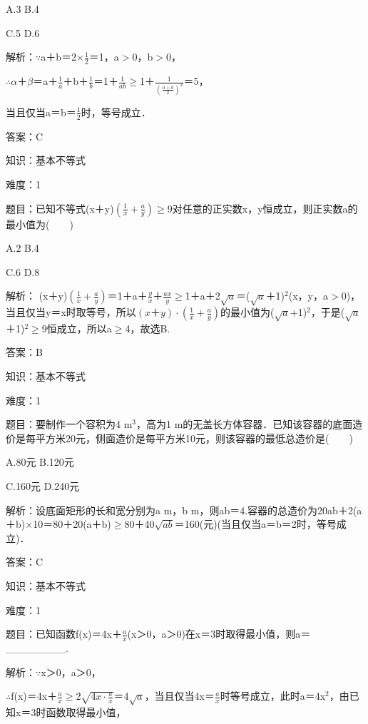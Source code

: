\documentclass{article} %
\begin{document}
A.3    B.4  

C.5    D.6

解析：$\mathrm{\because}$a＋b＝2$\mathrm{\times}$$\frac{1}{2}$＝1，a$\mathrm{>}$0，b$\mathrm{>}$0，

$\mathrm{\therefore}$$\alpha$＋$\beta$＝a＋$\frac{1}{a}$＋b＋$\frac{1}{b}$＝1＋$\frac{1}{ab}$$\mathrm{\ge}$1＋$\frac{1}{(\frac{a+b}{2})^2}$＝5，

当且仅当a＝b＝$\frac{1}{2}$时，等号成立．

答案：C



知识：基本不等式

难度：1

题目：已知不等式(x＋y)$(\frac{1}{x}+\frac{a}{y})$$\mathrm{\ge}$9对任意的正实数x，y恒成立，则正实数a的最小值为(　　)

A.2   B.4  

C.6   D.8

解析： (x＋y)$(\frac{1}{x}+\frac{a}{y})$＝1＋a＋$\frac{y}{x}$＋$\frac{ax}{y}$$\mathrm{\ge}$1＋a＋2$\sqrt{a}$＝($\sqrt{a}$＋1)${}^{2}$(x，y，a$\mathrm{>}$0)，当且仅当y＝x时取等号，所以$(x＋y)\cdot(\frac{1}{x}+\frac{a}{y})$的最小值为($\sqrt{a}$+1)${}^{2}$，于是($\sqrt{a}$＋1)${}^{2}$$\mathrm{\ge}$9恒成立，所以a$\mathrm{\ge}$4，故选B.

答案：B



知识：基本不等式

难度：1

题目：要制作一个容积为4 m${}^{3}$，高为1 m的无盖长方体容器．已知该容器的底面造价是每平方米20元，侧面造价是每平方米10元，则该容器的最低总造价是(　　)

A.80元  B.120元  

C.160元  D.240元

解析：设底面矩形的长和宽分别为a m，b m，则ab＝4.容器的总造价为20ab＋2(a＋b)$\mathrm{\times}$10＝80＋20(a＋b)$\mathrm{\ge}$80＋40$\sqrt{ab}$＝160(元)(当且仅当a＝b＝2时，等号成立)．

答案：C



知识：基本不等式

难度：1

题目：已知函数f(x)＝4x＋$\frac{a}{x}$(x＞0，a＞0)在x＝3时取得最小值，则a＝\_\_\_\_\_\_\_\_.

解析：$\mathrm{\because}$x＞0，a＞0，

$\mathrm{\therefore}$f(x)＝4x＋$\frac{a}{x}$$\mathrm{\ge}$2$\sqrt{4x\cdot\frac{a}{x}}$＝4$\sqrt{a}$，当且仅当4x＝$\frac{a}{x}$时等号成立，此时a＝4x${}^{2}$，由已知x＝3时函数取得最小值，
\end{document}

